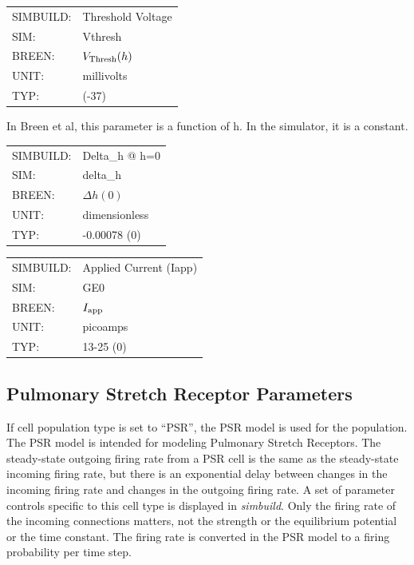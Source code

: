 \documentclass[12pt,openany,oneside]{book}
\newcommand{\prog}[1]{\textit{{#1}}}
\newcommand{\inquotes}[1]{{{``#1''}}}
\begin{document}
\begin{flushleft}
\begin{tabular}{@{}ll@{}}
SIMBUILD: & Threshold Voltage\\
SIM: & Vthresh\\
BREEN: & $V_{\rm Thresh}(h)$\\
UNIT: & millivolts\\
TYP: & (-37)\\
\end{tabular}
\end{flushleft}
\noindent In Breen et al, this parameter is a function of h. In the simulator,
it is a constant.
\filbreak
\vspace{2\baselineskip}

\begin{flushleft}
\begin{tabular}{@{}ll@{}}
SIMBUILD: & Delta\_h @ h=0\\
SIM: & delta\_h\\
BREEN: & $\Delta h(0)$\\
UNIT: & dimensionless\\
TYP: & -0.00078 (0)\\
\end{tabular}
\end{flushleft}
\noindent
\filbreak
\vspace{\baselineskip}

\begin{flushleft}
\begin{tabular}{@{}ll@{}}
SIMBUILD: & Applied Current (Iapp)\\
SIM: & GE0\\
BREEN: & $I_{\rm app}$\\
UNIT: & picoamps\\
TYP: & 13-25 (0)\\
\end{tabular}
\end{flushleft}
\noindent
\filbreak
\vspace{\baselineskip}

\subsection{Pulmonary Stretch Receptor Parameters}
\label{PSR Parameters}
If cell population type is set to \inquotes{PSR}, the PSR 
model is used for the population.  The PSR model is
intended for modeling Pulmonary Stretch Receptors. The steady-state
outgoing firing rate from a PSR cell is the same as the steady-state
incoming firing rate, but there is an exponential delay between
changes in the incoming firing rate and changes in the outgoing firing
rate.  A set of parameter controls specific to this cell type is displayed
in \prog{simbuild}.  Only the firing rate of the incoming connections matters, not
the strength or the equilibrium potential or the time constant. The
firing rate is converted in the PSR model to a firing probability per
time step.
\end{document}
